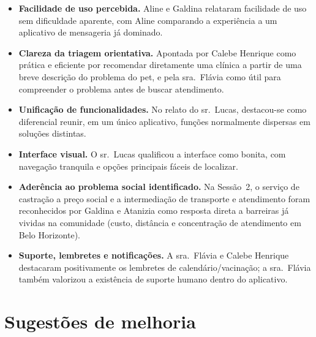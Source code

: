 \documentclass[
    12pt,
    openright,
    oneside,
    a4paper
]{abntex2}
\begin{document}
\begin{itemize}[leftmargin=*]
  \item \textbf{Facilidade de uso percebida.} Aline e Galdina relataram facilidade de uso sem
        dificuldade aparente, com Aline comparando a experiência a um aplicativo de
        mensageria já dominado.
  \item \textbf{Clareza da triagem orientativa.} Apontada por Calebe Henrique como
        prática e eficiente por recomendar diretamente uma clínica a partir de uma breve
        descrição do problema do pet, e pela sra.~Flávia como útil para
        compreender o problema antes de buscar atendimento.
  \item \textbf{Unificação de funcionalidades.} No relato do sr.~Lucas, destacou-se como
        diferencial reunir, em um único aplicativo, funções normalmente dispersas em soluções
        distintas.
  \item \textbf{Interface visual.} O sr.~Lucas qualificou a interface como bonita, com
        navegação tranquila e opções principais fáceis de localizar.
  \item \textbf{Aderência ao problema social identificado.} Na Sessão~2, o serviço de
        castração a preço social e a intermediação de transporte e atendimento foram
        reconhecidos por Galdina e Atanizia como resposta direta a barreiras já vividas na
        comunidade (custo, distância e concentração de atendimento em Belo Horizonte).
  \item \textbf{Suporte, lembretes e notificações.} A sra.~Flávia e Calebe Henrique
        destacaram positivamente os lembretes de
        calendário/vacinação; a sra.~Flávia também valorizou a existência de suporte humano
        dentro do aplicativo.
\end{itemize}

\section{Sugestões de melhoria}
\end{document}
